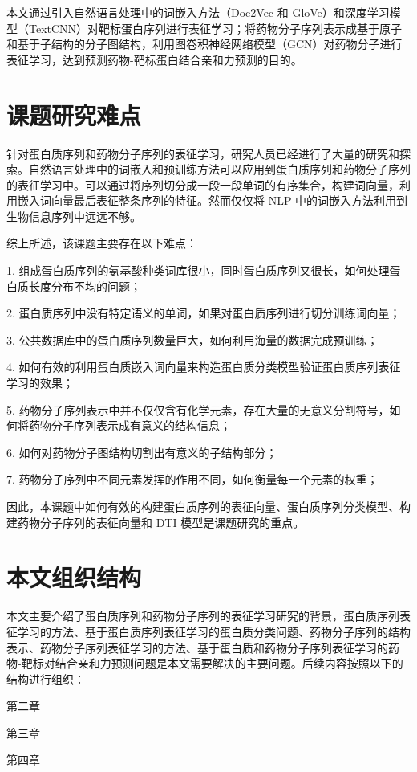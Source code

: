 本文通过引入自然语言处理中的词嵌入方法（Doc2Vec 和 GloVe）和深度学习模型（TextCNN）对靶标蛋白序列进行表征学习；将药物分子序列表示成基于原子和基于子结构的分子图结构，利用图卷积神经网络模型（GCN）对药物分子进行表征学习，达到预测药物-靶标蛋白结合亲和力预测的目的。

\section{课题研究难点}

针对蛋白质序列和药物分子序列的表征学习，研究人员已经进行了大量的研究和探索。自然语言处理中的词嵌入和预训练方法可以应用到蛋白质序列和药物分子序列的表征学习中。可以通过将序列切分成一段一段单词的有序集合，构建词向量，利用嵌入词向量最后表征整条序列的特征。然而仅仅将 NLP 中的词嵌入方法利用到生物信息序列中远远不够。

综上所述，该课题主要存在以下难点：

1. 组成蛋白质序列的氨基酸种类词库很小，同时蛋白质序列又很长，如何处理蛋白质长度分布不均的问题；

2. 蛋白质序列中没有特定语义的单词，如果对蛋白质序列进行切分训练词向量；

3. 公共数据库中的蛋白质序列数量巨大，如何利用海量的数据完成预训练；

4. 如何有效的利用蛋白质嵌入词向量来构造蛋白质分类模型验证蛋白质序列表征学习的效果；

5. 药物分子序列表示中并不仅仅含有化学元素，存在大量的无意义分割符号，如何将药物分子序列表示成有意义的结构信息；

6. 如何对药物分子图结构切割出有意义的子结构部分；

7. 药物分子序列中不同元素发挥的作用不同，如何衡量每一个元素的权重；

因此，本课题中如何有效的构建蛋白质序列的表征向量、蛋白质序列分类模型、构建药物分子序列的表征向量和 DTI 模型是课题研究的重点。

\section{本文组织结构}

本文主要介绍了蛋白质序列和药物分子序列的表征学习研究的背景，蛋白质序列表征学习的方法、基于蛋白质序列表征学习的蛋白质分类问题、药物分子序列的结构表示、药物分子序列表征学习的方法、基于蛋白质和药物分子序列表征学习的药物-靶标对结合亲和力预测问题是本文需要解决的主要问题。后续内容按照以下的结构进行组织：

第二章

第三章

第四章


